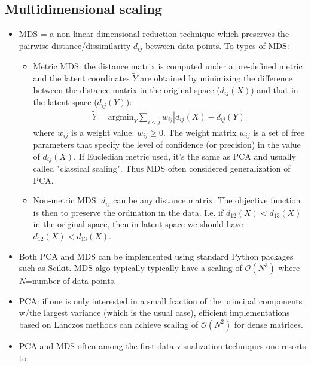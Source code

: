 \documentclass[norsk,a4paper,11pt]{article}
\begin{document}
\subsection{Multidimensional scaling}
\begin{itemize}
	\item MDS = a non-linear dimensional reduction technique which preserves the pairwise distance/dissimilarity $d_{ij}$ between data points. To types of MDS:
	\begin{itemize}
		\item Metric MDS: the distance matrix is computed under a pre-defined metric and the latent coordinates $\tilde{Y}$ are obtained by minimizing the difference between the distance matrix in the original space ($d_{ij} (X)$) and that in the latent space ($d_{ij} (Y)$):
		\begin{align}
			\tilde{Y} = \text{argmin}_Y \sum_{i<j} w_{ij}|d_{ij} (X) - d_{ij}(Y)|
		\end{align}
		where $w_{ij}$ is a weight value: $w_{ij} \geq 0$. The weight matrix $w_{ij}$ is a set of free parameters that specify the level of confidence (or precision) in the value of $d_{ij} (X)$. If Eucledian metric used, it's the same as PCA and usually called "classical scaling". Thus MDS often considered generalization of PCA. 
		\item Non-metric MDS: $d_{ij}$ can be any distance matrix. The objective function is then to preserve the ordination in the data. I.e. if $d_{12} (X) < d_{13} (X)$ in the original space, then in latent space we should have $d_{12} (X) < d_{13} (X)$.  
	\end{itemize}
	\item Both PCA and MDS can be implemented using standard Python packages such as Scikit. MDS algo typically typically have a scaling of $\mathcal{O} (N^3)$ where $N$=number of data points. 
	\item PCA: if one is only interested in a small fraction of the principal components w/the largest variance (which is the usual case), efficient implementations based on Lanczos methods can achieve scaling of $\mathcal{O} (N^2)$ for dense matrices.
	\item PCA and MDS often among the first data visualization techniques one resorts to.
\end{itemize}
\end{document}
